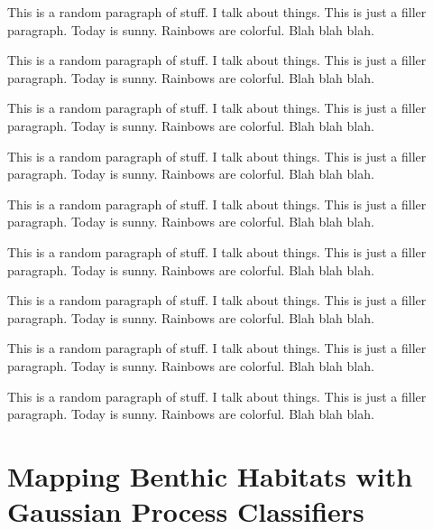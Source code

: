 \documentclass{article}
\begin{document}
		{\color{BurntOrange} This is a random paragraph of stuff. I talk about things. This is just a filler paragraph. Today is sunny. Rainbows are colorful. Blah blah blah.}
		
		{\color{BurntOrange} This is a random paragraph of stuff. I talk about things. This is just a filler paragraph. Today is sunny. Rainbows are colorful. Blah blah blah.}
		
		{\color{BurntOrange} This is a random paragraph of stuff. I talk about things. This is just a filler paragraph. Today is sunny. Rainbows are colorful. Blah blah blah.}
		
		{\color{BurntOrange} This is a random paragraph of stuff. I talk about things. This is just a filler paragraph. Today is sunny. Rainbows are colorful. Blah blah blah.}
		
		{\color{BurntOrange} This is a random paragraph of stuff. I talk about things. This is just a filler paragraph. Today is sunny. Rainbows are colorful. Blah blah blah.}
		
		{\color{BurntOrange} This is a random paragraph of stuff. I talk about things. This is just a filler paragraph. Today is sunny. Rainbows are colorful. Blah blah blah.}
		
		{\color{BurntOrange} This is a random paragraph of stuff. I talk about things. This is just a filler paragraph. Today is sunny. Rainbows are colorful. Blah blah blah.}
		
		{\color{BurntOrange} This is a random paragraph of stuff. I talk about things. This is just a filler paragraph. Today is sunny. Rainbows are colorful. Blah blah blah.}
		
		{\color{BurntOrange} This is a random paragraph of stuff. I talk about things. This is just a filler paragraph. Today is sunny. Rainbows are colorful. Blah blah blah.}
			
\section{Mapping Benthic Habitats with Gaussian Process Classifiers}
\label{Section:BenthicMapping}
\end{document}
